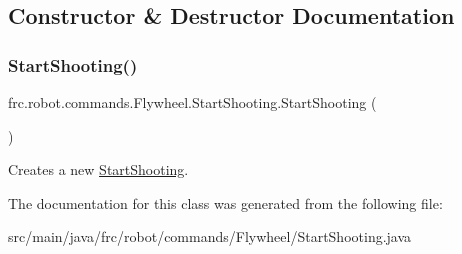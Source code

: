 \subsection{Constructor \& Destructor Documentation}
\mbox{\label{classfrc_1_1robot_1_1commands_1_1_flywheel_1_1_start_shooting_ae5b4d82a05f7e96e608972ddb793c1aa}} 
\subsubsection{\texorpdfstring{StartShooting()}{StartShooting()}}
{\footnotesize\ttfamily frc.\+robot.\+commands.\+Flywheel.\+Start\+Shooting.\+Start\+Shooting (\begin{DoxyParamCaption}{ }\end{DoxyParamCaption})\hspace{0.3cm}{\ttfamily [inline]}}

Creates a new \mbox{\hyperlink{classfrc_1_1robot_1_1commands_1_1_flywheel_1_1_start_shooting}{Start\+Shooting}}. 

The documentation for this class was generated from the following file\+:\begin{DoxyCompactItemize}
\item 
src/main/java/frc/robot/commands/\+Flywheel/Start\+Shooting.\+java\end{DoxyCompactItemize}
